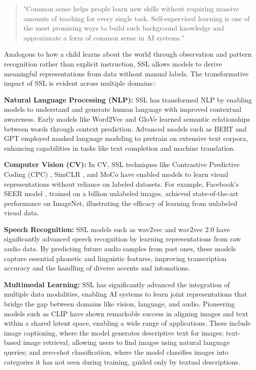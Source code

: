 \begin{quote}
    "Common sense helps people learn new skills without requiring massive amounts of teaching for every single task. Self-supervised learning is one of the most promising ways to build such background knowledge and approximate a form of common sense in AI systems."
\end{quote}

Analogous to how a child learns about the world through observation and pattern recognition rather than explicit instruction, SSL allows models to derive meaningful representations from data without manual labels. The transformative impact of SSL is evident across multiple domains::

\textbf{Natural Language Processing (NLP):} SSL has transformed NLP by enabling models to understand and generate human language with improved contextual awareness. Early models like Word2Vec \citep{mikolov2013efficient} and GloVe \citep{pennington2014glove} learned semantic relationships between words through context prediction. Advanced models such as BERT \citep{devlin2019bert} and GPT \citep{radford2019language} employed masked language modeling to pretrain on extensive text corpora, enhancing capabilities in tasks like text completion and machine translation.

\textbf{Computer Vision (CV):} In CV, SSL techniques like Contrastive Predictive Coding (CPC) \citep{oord2018representation}, SimCLR \citep{chen2020simple}, and MoCo \citep{he2020momentum} have enabled models to learn visual representations without reliance on labeled datasets. For example, Facebook's SEER model \citep{goyal2021self}, trained on a billion unlabeled images, achieved state-of-the-art performance on ImageNet, illustrating the efficacy of learning from unlabeled visual data.

\textbf{Speech Recognition:} SSL models such as wav2vec \citep{schneider2019wav2vec} and wav2vec 2.0 \citep{baevski2020wav2vec} have significantly advanced speech recognition by learning representations from raw audio data. By predicting future audio samples from past ones, these models capture essential phonetic and linguistic features, improving transcription accuracy and the handling of diverse accents and intonations.

\textbf{Multimodal Learning:} SSL has significantly advanced the integration of multiple data modalities, enabling AI systems to learn joint representations that bridge the gap between domains like vision, language, and audio. Pioneering models such as CLIP \citep{radford2021learning} have shown remarkable success in aligning images and text within a shared latent space, enabling a wide range of applications. These include image captioning, where the model generates descriptive text for images; text-based image retrieval, allowing users to find images using natural language queries; and zero-shot classification, where the model classifies images into categories it has not seen during training, guided only by textual descriptions.


